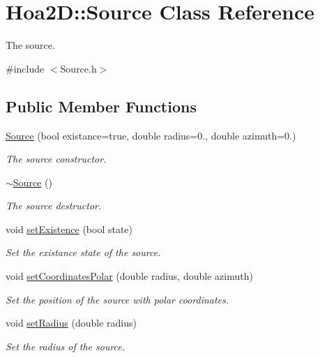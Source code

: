 \hypertarget{class_hoa2_d_1_1_source}{\section{Hoa2\-D\-:\-:Source Class Reference}
\label{class_hoa2_d_1_1_source}
}


The source.  




{\ttfamily \#include $<$Source.\-h$>$}

\subsection*{Public Member Functions}
\begin{DoxyCompactItemize}
\item 
\hyperlink{class_hoa2_d_1_1_source_a211e040a4377e5163bc23fbf4bcf374d}{Source} (bool existance=true, double radius=0., double azimuth=0.)
\begin{DoxyCompactList}\small\item\em The source constructor. \end{DoxyCompactList}\item 
\hyperlink{class_hoa2_d_1_1_source_ae5d9130e101151dbceb0a23f9df62807}{$\sim$\-Source} ()
\begin{DoxyCompactList}\small\item\em The source destructor. \end{DoxyCompactList}\item 
void \hyperlink{class_hoa2_d_1_1_source_a1ccb8d392b049df8308bd9c0b3639764}{set\-Existence} (bool state)
\begin{DoxyCompactList}\small\item\em Set the existance state of the source. \end{DoxyCompactList}\item 
void \hyperlink{class_hoa2_d_1_1_source_a663a68879c3fb11941048b3584fa4189}{set\-Coordinates\-Polar} (double radius, double azimuth)
\begin{DoxyCompactList}\small\item\em Set the position of the source with polar coordinates. \end{DoxyCompactList}\item 
void \hyperlink{class_hoa2_d_1_1_source_a78bdd84f1836063ffd9982b40bff20ba}{set\-Radius} (double radius)
\begin{DoxyCompactList}\small\item\em Set the radius of the source. \end{DoxyCompactList}\item 

\end{DoxyCompactItemize}
